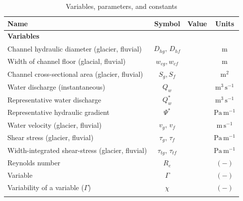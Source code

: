\documentclass[11pt]{article}
\begin{document}
\begin{spacing}{1}
          \begin{table}[H]
            \centering
            \caption{Variables, parameters, and constants }
            \begin{tabular}{ l  c  c c }
              Name &Symbol&  Value&Units \\ \hline
              \textbf{Variables}  & & & \\
              Channel hydraulic diameter (glacier, fluvial) &  $D_{hg},\,D_{hf}$&  & $\mathrm{m}$     \\
              Width of channel floor (glacial, fluvial) & $w_{cg},w_{cf}$&  & $\mathrm{m}$     \\
              Channel cross-sectional area (glacier, fluvial) &  $S_g, S_f$& & $\mathrm{m^2}$     \\
              Water discharge (instantaneous) & $Q_w$& & $\mathrm{m^{3}\,s^{-1}}$ \\
              Representative water discharge & $Q_{w}^*$& & $\mathrm{m^{3}\,s^{-1}}$ \\
              Representative hydraulic gradient  &$\Psi^*$ & & $\mathrm{Pa\, m^{-1}}$\\
              Water velocity (glacier, fluvial)  & $v_g,\,v_{f}$& & $\mathrm{m\,s^{-1}}$ \\
              Shear stress (glacier, fluvial) & $\tau_g,\,\tau_f$&& $\mathrm{Pa \, m^{-1}}$ \\
              Width-integrated shear-stress (glacier, fluvial) & $\tau_{tg},\, \tau_{tf}$&& $\mathrm{Pa \, m^{-1}}$ \\
              Reynolds number &$R_e$& & $\mathrm{(-)}$\\
              Variable &$\Gamma$&&$\mathrm{(-)}$\\
              Variability of a variable ($\Gamma$) &$\chi$& &$\mathrm{(-)}$\\
                   &&&\\
        

\end{tabular}
\end{table}
\end{spacing}
\end{document}

